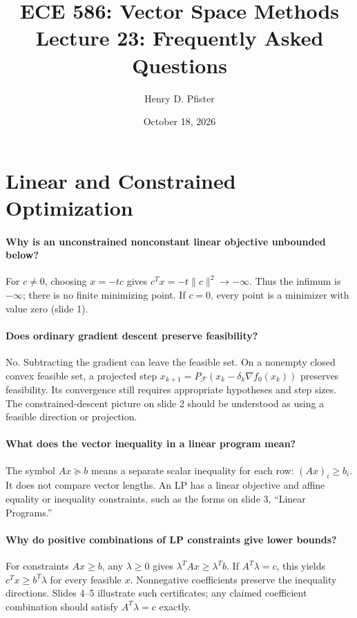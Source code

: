 \documentclass[10pt,english]{article}
\begin{document}
\title{ECE 586: Vector Space Methods \\ Lecture 23: Frequently Asked Questions}
\author{Henry D. Pfister \\ \univ}
\date{October 18, 2026}

\maketitle

\section{Linear and Constrained Optimization}

\paragraph{Why is an unconstrained nonconstant linear objective unbounded below?}
For $c\neq0$, choosing $x=-tc$ gives $c^T x=-t\|c\|^2\to-\infty$.
Thus the infimum is $-\infty$; there is no finite minimizing point.
If $c=0$, every point is a minimizer with value zero (slide 1).

\paragraph{Does ordinary gradient descent preserve feasibility?}
No. Subtracting the gradient can leave the feasible set.
On a nonempty closed convex feasible set, a projected step $x_{k+1}=P_{\mathcal F}(x_k-\delta_k\nabla f_0(x_k))$ preserves feasibility.
Its convergence still requires appropriate hypotheses and step sizes.
The constrained-descent picture on slide 2 should be understood as using a feasible direction or projection.

\paragraph{What does the vector inequality in a linear program mean?}
The symbol $Ax\succeq b$ means a separate scalar inequality for each row: $(Ax)_i\geq b_i$.
It does not compare vector lengths.
An LP has a linear objective and affine equality or inequality constraints, such as the forms on slide 3, ``Linear Programs.''

\paragraph{Why do positive combinations of LP constraints give lower bounds?}
For constraints $Ax\geq b$, any $\lambda\geq0$ gives $\lambda^T Ax\geq\lambda^T b$.
If $A^T\lambda=c$, this yields $c^T x\geq b^T\lambda$ for every feasible $x$.
Nonnegative coefficients preserve the inequality directions.
Slides 4--5 illustrate such certificates; any claimed coefficient combination should satisfy $A^T\lambda=c$ exactly.
\end{document}
